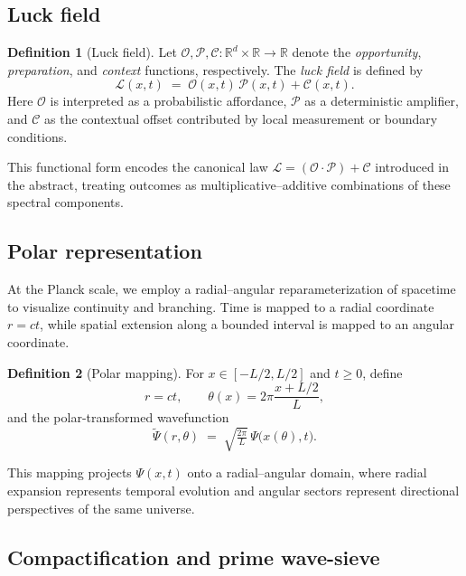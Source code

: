 \documentclass[12pt]{article}
\newcommand{\Luck}{\mathcal{L}}
\newcommand{\Opp}{\mathcal{O}}
\newcommand{\Prep}{\mathcal{P}}
\newcommand{\Circ}{\mathcal{C}}
\newcommand{\Psit}{\tilde{\Psi}}
\theoremstyle{plain}
\theoremstyle{definition}
\newtheorem{definition}{Definition}
\begin{document}
\subsection{Luck field}

\begin{definition}[Luck field]
Let $\Opp,\Prep,\Circ : \mathbb{R}^d \times \mathbb{R} \to \mathbb{R}$ denote 
the \emph{opportunity}, \emph{preparation}, and \emph{context} functions, 
respectively.  
The \emph{luck field} is defined by
\[
\Luck(x,t) \;=\; \Opp(x,t)\,\Prep(x,t) + \Circ(x,t).
\]
Here $\Opp$ is interpreted as a probabilistic affordance, $\Prep$ as a 
deterministic amplifier, and $\Circ$ as the contextual offset contributed by 
local measurement or boundary conditions.  
\end{definition}

This functional form encodes the canonical law 
$\Luck = (\Opp \cdot \Prep) + \Circ$ introduced in the abstract, treating outcomes 
as multiplicative–additive combinations of these spectral components.

\subsection{Polar representation}

At the Planck scale, we employ a radial–angular reparameterization of spacetime 
to visualize continuity and branching. Time is mapped to a radial coordinate 
$r = ct$, while spatial extension along a bounded interval is mapped to an 
angular coordinate.

\begin{definition}[Polar mapping]
For $x \in [-L/2,L/2]$ and $t \ge 0$, define
\[
r = c t, 
\qquad 
\theta(x) = 2\pi \frac{x + L/2}{L},
\]
and the polar-transformed wavefunction
\[
\Psit(r,\theta) 
\;=\; \sqrt{\tfrac{2\pi}{L}}\, \Psi\!\bigl(x(\theta), t\bigr).
\]
\end{definition}

This mapping projects $\Psi(x,t)$ onto a radial–angular domain, where radial 
expansion represents temporal evolution and angular sectors represent directional 
perspectives of the same universe.

\subsection{Compactification and prime wave-sieve}
\end{document}
